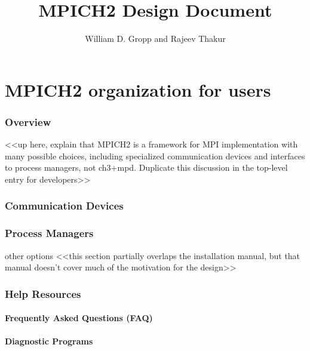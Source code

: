\documentclass{article}
\begin{document}

\title{MPICH2 Design Document}
\author{William D. Gropp and Rajeev Thakur}
\maketitle

\tableofcontents
\clearpage



\pagestyle{headings}

\part{MPICH2 organization for users}

\section{Overview}
     <<up here, explain that MPICH2 is a framework for MPI implementation with many possible choices, including specialized communication devices and interfaces to process managers, not ch3+mpd.  Duplicate this discussion in the top-level entry for developers>>

\section{Communication Devices}

\section{Process Managers}

    other options 
    <<this section partially overlaps the installation manual, but that manual doesn't cover much of the motivation for the design>>

\section{Help Resources}

\subsection{Frequently Asked Questions (FAQ)}

\subsection{Diagnostic Programs}
\end{document}
